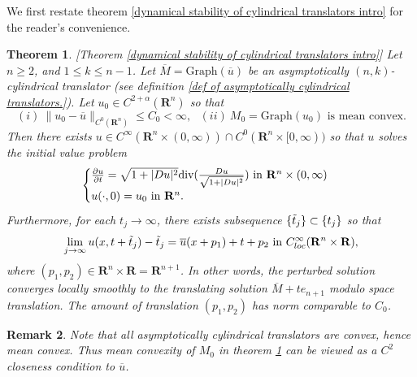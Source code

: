 \documentclass[pdflatex,sn-mathphys-num]{sn-jnl}%
\newtheorem{theorem}{Theorem}[section]
\newtheorem{remark}[theorem]{Remark}
\begin{document}
We first restate theorem \ref{dynamical stability of cylindrical translators intro} for the reader's convenience. 
\begin{theorem}\label{dynamical stability of asymptotically cylindrical translators section theorem}[Theorem \ref{dynamical stability of cylindrical translators intro}]
Let $n \geq 2$, and $1 \leq k \leq n-1$. Let $\overline{M} = \text{Graph}(\overline{u})$ be an asymptotically $(n,k)$-cylindrical translator (see definition \ref{def of asymptotically cylindrical translators.}). Let $u_0\in C^{2 + \alpha}(\mathbf{R}^n)$ so that
\begin{equation}\label{initial assumption on perturbation asympt cyll}
    (i)\  \|u_0 - \overline{u}\|_{C^0(\mathbf{R}^n)} \leq C_0 < \infty, \ \ \ (ii)\  M_0 = \text{Graph}(u_0) \text{ is mean convex}.
\end{equation}
Then there exists $u \in C^{\infty}(\mathbf{R}^n \times (0, \infty))\cap C^0(\mathbf{R}^n \times [0, \infty))$ so that $u$ solves the initial value problem
\begin{equation}
    \begin{cases}
    \frac{\partial u}{\partial t} = \sqrt{1 + |Du|^2}\textit{\emph{div}}(\frac{Du}{\sqrt{1 + |Du|^2}}) \text{ in }\mathbf{R}^n \times (0, \infty) \\ u(\cdot, 0) = u_0 \text{ in }\mathbf{R}^n.
    \end{cases}
\end{equation}
Furthermore, for each $t_j \to \infty$, there exists subsequence $\{\Tilde{t}_j\} \subset \{t_j\}$ so that
\begin{equation}
    \lim_{j \to \infty}u(x, t + \Tilde{t}_j) - \Tilde{t}_j = \overline{u}(x + p_1)+t + p_2 \text{ in }C^{\infty}_{loc}(\mathbf{R}^n\times \mathbf{R}),
\end{equation}
where $(p_1, p_2) \in \mathbf{R}^n \times \mathbf{R} = \mathbf{R}^{n+1}$. In other words, the perturbed solution converges locally smoothly to the translating solution $\overline{M} + te_{n+1}$ modulo space translation. The amount of translation $(p_1, p_2)$ has norm comparable to $C_0$.
\end{theorem}
\begin{remark}
    Note that all asymptotically cylindrical translators are convex, hence mean convex. Thus mean convexity of $M_0$ in theorem \ref{dynamical stability of asymptotically cylindrical translators section theorem} can be viewed as a $C^2$ closeness condition to $\overline{u}$. 
\end{remark}
\end{document}
